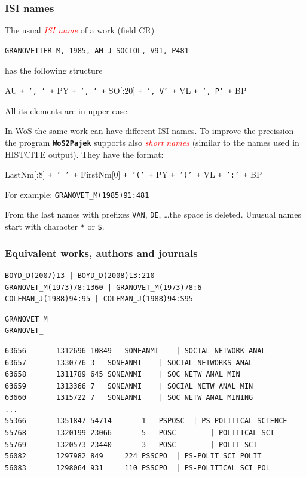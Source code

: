 \documentclass[hyperref={pdfstartview={FitBH -32768},
                         pdfpagemode=FullScreen,
                         plainpages=false,
                         colorlinks=true}
              ]{beamer}
\newcommand{\WoSPajek}{\texttt{\textbf{WoS2Pajek}}\xspace}
\newcommand{\keyw}[1]{\textcolor{red}{\emph{#1}}}
\begin{document}
\begin{frame}[fragile]
\frametitle{ISI names}
\footnotesize
The usual \keyw{ISI name} of a work (field CR)
\begin{verbatim}
GRANOVETTER M, 1985, AM J SOCIOL, V91, P481
\end{verbatim}
has the following structure\medskip

   AU \texttt{+ ', ' +} PY \texttt{+ ', ' +} SO[:20] \texttt{+ ', V' +} VL  \texttt{+ ', P' +} BP\medskip

\noindent All its elements are in upper case.

In WoS the same work can have different ISI names. To improve
the precission the program \WoSPajek supports also
\keyw{short names} (similar to the names used in HISTCITE output).
They have the format:\medskip

   LastNm[:8] \texttt{+ '\_' +} FirstNm[0] \texttt{+ '(' +} PY
   \texttt{+ ')' +} VL \texttt{+ ':' +} BP\medskip

For example: \quad
\texttt{GRANOVET\_M(1985)91:481}

From the last names with prefixes \texttt{VAN}, \texttt{DE}, \ldots the space is deleted.
Unusual names start with character \texttt{*} or \texttt{\$}.

\end{frame}

\begin{frame}[fragile]
\frametitle{Equivalent works, authors and journals}
\footnotesize

\begin{verbatim}
BOYD_D(2007)13 | BOYD_D(2008)13:210
GRANOVET_M(1973)78:1360 | GRANOVET_M(1973)78:6
COLEMAN_J(1988)94:95 | COLEMAN_J(1988)94:S95
\end{verbatim}

\begin{verbatim}
GRANOVET_M
GRANOVET_
\end{verbatim}

\begin{verbatim}
63656		1312696	10849	SONEANMI	| SOCIAL NETWORK ANAL
63657		1330776	3	SONEANMI	| SOCIAL NETWORKS ANAL
63658		1311789	645	SONEANMI	| SOC NETW ANAL MIN
63659		1313366	7	SONEANMI	| SOCIAL NETW ANAL MIN
63660		1315722	7	SONEANMI	| SOC NETW ANAL MINING
...
55366		1351847	54714		1	PSPOSC 	| PS POLITICAL SCIENCE
55768		1320199	23066		5	POSC		| POLITICAL SCI
55769		1320573	23440		3	POSC		| POLIT SCI
56082		1297982	849		224	PSSCPO	| PS-POLIT SCI POLIT
56083		1298064	931		110	PSSCPO	| PS-POLITICAL SCI POL
\end{verbatim}
\end{frame}
\end{document}

